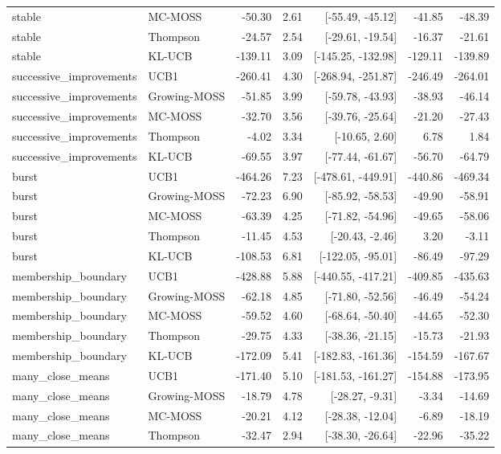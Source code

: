 \documentclass[11pt]{article}
\theoremstyle{remark}
\begin{document}
\begin{longtable}{llrrrrr}
stable & MC-MOSS & -50.30 & 2.61 & [-55.49, -45.12] & -41.85 & -48.39 \\
stable & Thompson & -24.57 & 2.54 & [-29.61, -19.54] & -16.37 & -21.61 \\
stable & KL-UCB & -139.11 & 3.09 & [-145.25, -132.98] & -129.11 & -139.89 \\
successive\_improvements & UCB1 & -260.41 & 4.30 & [-268.94, -251.87] & -246.49 & -264.01 \\
successive\_improvements & Growing-MOSS & -51.85 & 3.99 & [-59.78, -43.93] & -38.93 & -46.14 \\
successive\_improvements & MC-MOSS & -32.70 & 3.56 & [-39.76, -25.64] & -21.20 & -27.43 \\
successive\_improvements & Thompson & -4.02 & 3.34 & [-10.65, 2.60] & 6.78 & 1.84 \\
successive\_improvements & KL-UCB & -69.55 & 3.97 & [-77.44, -61.67] & -56.70 & -64.79 \\
burst & UCB1 & -464.26 & 7.23 & [-478.61, -449.91] & -440.86 & -469.34 \\
burst & Growing-MOSS & -72.23 & 6.90 & [-85.92, -58.53] & -49.90 & -58.91 \\
burst & MC-MOSS & -63.39 & 4.25 & [-71.82, -54.96] & -49.65 & -58.06 \\
burst & Thompson & -11.45 & 4.53 & [-20.43, -2.46] & 3.20 & -3.11 \\
burst & KL-UCB & -108.53 & 6.81 & [-122.05, -95.01] & -86.49 & -97.29 \\
membership\_boundary & UCB1 & -428.88 & 5.88 & [-440.55, -417.21] & -409.85 & -435.63 \\
membership\_boundary & Growing-MOSS & -62.18 & 4.85 & [-71.80, -52.56] & -46.49 & -54.24 \\
membership\_boundary & MC-MOSS & -59.52 & 4.60 & [-68.64, -50.40] & -44.65 & -52.30 \\
membership\_boundary & Thompson & -29.75 & 4.33 & [-38.36, -21.15] & -15.73 & -21.93 \\
membership\_boundary & KL-UCB & -172.09 & 5.41 & [-182.83, -161.36] & -154.59 & -167.67 \\
many\_close\_means & UCB1 & -171.40 & 5.10 & [-181.53, -161.27] & -154.88 & -173.95 \\
many\_close\_means & Growing-MOSS & -18.79 & 4.78 & [-28.27, -9.31] & -3.34 & -14.69 \\
many\_close\_means & MC-MOSS & -20.21 & 4.12 & [-28.38, -12.04] & -6.89 & -18.19 \\
many\_close\_means & Thompson & -32.47 & 2.94 & [-38.30, -26.64] & -22.96 & -35.22 \\

\end{longtable}
\end{document}
